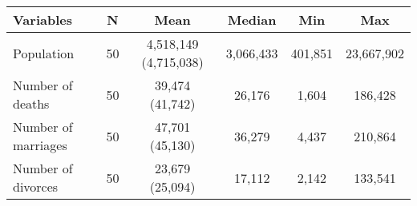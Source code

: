 
\begin{tabular}{lccccc}
\toprule
Variables & N & Mean & Median & Min & Max\\
\midrule
Population & 50 & 4,518,149 (4,715,038) & 3,066,433 & 401,851 & 23,667,902\\
Number of deaths & 50 & 39,474 (41,742) & 26,176 & 1,604 & 186,428\\
Number of marriages & 50 & 47,701 (45,130) & 36,279 & 4,437 & 210,864\\
Number of divorces & 50 & 23,679 (25,094) & 17,112 & 2,142 & 133,541\\
\bottomrule
\end{tabular}